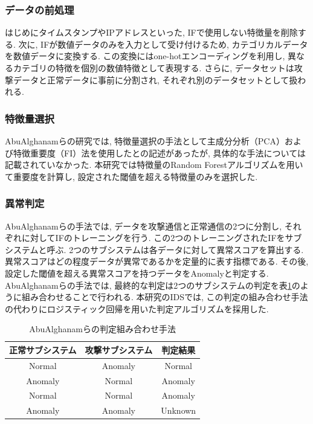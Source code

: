 \documentclass{css}
\begin{document}
\subsubsection{データの前処理}

はじめにタイムスタンプやIPアドレスといった, IFで使用しない特徴量を削除する. 次に, IFが数値データのみを入力として受け付けるため, カテゴリカルデータを数値データに変換する. この変換にはone-hotエンコーディングを利用し, 異なるカテゴリの特徴を個別の数値特徴として表現する. さらに, データセットは攻撃データと正常データに事前に分割され, それぞれ別のデータセットとして扱われる. 

\subsubsection{特徴量選択}
AbuAlghanamらの研究では, 特徴量選択の手法として主成分分析（PCA）および特徴重要度（FI）法を使用した\cite{AbuAlghanam2023-sx}との記述があったが, 具体的な手法については記載されていなかった. 本研究では特徴量のRandom Forestアルゴリズムを用いて重要度を計算し, 設定された閾値を超える特徴量のみを選択した. 

\subsubsection{異常判定}
AbuAlghanamらの手法では, データを攻撃通信と正常通信の2つに分割し, それぞれに対してIFのトレーニングを行う. この2つのトレーニングされたIFをサブシステムと呼ぶ. 2つのサブシステムは各データに対して異常スコアを算出する. 異常スコアはどの程度データが異常であるかを定量的に表す指標である. その後, 設定した閾値を超える異常スコアを持つデータをAnomalyと判定する. AbuAlghanamらの手法では, 最終的な判定は2つのサブシステムの判定を表\ref{tab:combination}のように組み合わせることで行われる. 本研究のIDSでは, この判定の組み合わせ手法の代わりにロジスティック回帰を用いた判定アルゴリズムを採用した. 

\begin{table}[ht]
    \caption{AbuAlghanamらの判定組み合わせ手法}
    \centering
    \footnotesize
    \begin{tabular}{ccc}
        \hline\hline
        正常サブシステム & 攻撃サブシステム & 判定結果\\
        \hline
        Normal & Anomaly & Normal \\
        Anomaly & Normal & Anomaly \\
        Normal & Normal & Anomaly \\
        Anomaly & Anomaly & Unknown \\
        \hline
    \end{tabular}
    \label{tab:combination}
\end{table}
\end{document}
